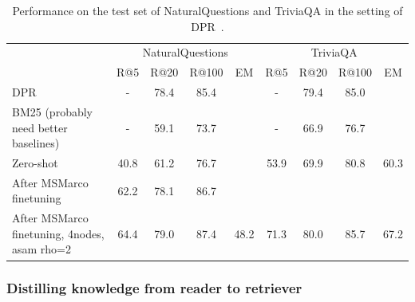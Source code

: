 \begin{table}[h!]
\centering
\begin{tabular}{l|cccc|cccc} 
 \toprule
  & \multicolumn{4}{c}{NaturalQuestions} & \multicolumn{4}{c}{TriviaQA} \\
  & R@5 & R@20 & R@100 & EM &  R@5 & R@20 & R@100 & EM\\ 
 \midrule
 DPR~\citep{karpukhin2020dense} & - &  78.4 & 85.4 & & - & 79.4 & 85.0\\ 
 BM25 (probably need better baselines) & - & 59.1 & 73.7 & & - & 66.9 & 76.7\\
 
 Zero-shot & 40.8 & 61.2 & 76.7 & & 53.9 &  69.9 & 80.8 & 60.3\\
 After MSMarco finetuning & 62.2 & 78.1 & 86.7 & \\
 After MSMarco finetuning, 4nodes, asam rho=2 & 64.4 & 79.0 & 87.4 & 48.2 & 71.3 & 80.0 & 85.7 & 67.2\\
 \bottomrule
\end{tabular}
\caption{Performance on the test set of NaturalQuestions and TriviaQA in the setting of DPR~\citep{karpukhin2020dense}.}
\label{tab:qa_zs}
\end{table}

\subsubsection{Distilling knowledge from reader to retriever}


